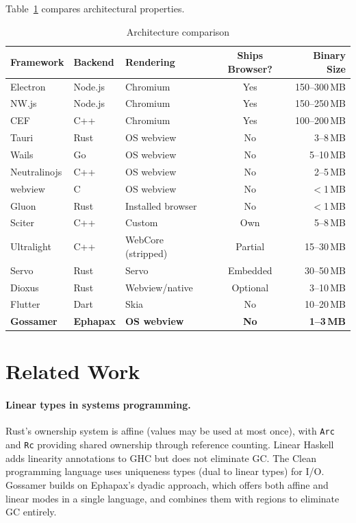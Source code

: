 \documentclass[11pt,a4paper]{article}
\theoremstyle{definition}
\begin{document}
Table~\ref{tab:arch} compares architectural properties.

\begin{table}[ht]
\centering
\caption{Architecture comparison}
\label{tab:arch}
\small
\begin{tabular}{@{}lllcr@{}}
\toprule
\textbf{Framework} & \textbf{Backend} & \textbf{Rendering} & \textbf{Ships Browser?} & \textbf{Binary Size} \\
\midrule
Electron      & Node.js   & Chromium           & Yes  & 150--300\,MB \\
NW.js         & Node.js   & Chromium           & Yes  & 150--250\,MB \\
CEF           & C++       & Chromium           & Yes  & 100--200\,MB \\
Tauri         & Rust      & OS webview         & No   & 3--8\,MB \\
Wails         & Go        & OS webview         & No   & 5--10\,MB \\
Neutralinojs  & C++       & OS webview         & No   & 2--5\,MB \\
webview       & C         & OS webview         & No   & $<$1\,MB \\
Gluon         & Rust      & Installed browser  & No   & $<$1\,MB \\
Sciter        & C++       & Custom             & Own  & 5--8\,MB \\
Ultralight    & C++       & WebCore (stripped)  & Partial & 15--30\,MB \\
Servo         & Rust      & Servo              & Embedded & 30--50\,MB \\
Dioxus        & Rust      & Webview/native     & Optional & 3--10\,MB \\
Flutter       & Dart      & Skia               & No   & 10--20\,MB \\
\midrule
\textbf{Gossamer} & \textbf{Ephapax} & \textbf{OS webview} & \textbf{No} & \textbf{1--3\,MB} \\
\bottomrule
\end{tabular}
\end{table}

\section{Related Work}
\label{sec:related}

\paragraph{Linear types in systems programming.}
Rust's ownership system is affine (values may be used at most once),
with \texttt{Arc} and \texttt{Rc} providing shared ownership through
reference counting. Linear Haskell~\cite{bernardy2018} adds linearity
annotations to GHC but does not eliminate GC. The Clean programming
language uses uniqueness types (dual to linear types) for I/O.
Gossamer builds on Ephapax's dyadic approach, which offers both affine
and linear modes in a single language, and combines them with regions
to eliminate GC entirely.
\end{document}
